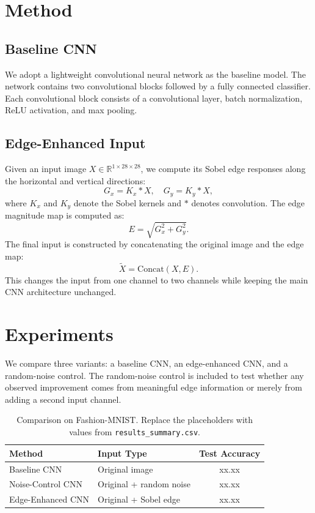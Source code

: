 \documentclass[10pt,conference]{IEEEtran}
\begin{document}
\section{Method}

\subsection{Baseline CNN}

We adopt a lightweight convolutional neural network as the baseline model. The network contains two convolutional blocks followed by a fully connected classifier. Each convolutional block consists of a convolutional layer, batch normalization, ReLU activation, and max pooling.

\subsection{Edge-Enhanced Input}

Given an input image $X \in \mathbb{R}^{1 \times 28 \times 28}$, we compute its Sobel edge responses along the horizontal and vertical directions:
\begin{equation}
G_x = K_x * X, \quad G_y = K_y * X,
\end{equation}
where $K_x$ and $K_y$ denote the Sobel kernels and $*$ denotes convolution. The edge magnitude map is computed as:
\begin{equation}
E = \sqrt{G_x^2 + G_y^2}.
\end{equation}
The final input is constructed by concatenating the original image and the edge map:
\begin{equation}
\tilde{X} = \mathrm{Concat}(X, E).
\end{equation}
This changes the input from one channel to two channels while keeping the main CNN architecture unchanged.

\section{Experiments}

We compare three variants: a baseline CNN, an edge-enhanced CNN, and a random-noise control. The random-noise control is included to test whether any observed improvement comes from meaningful edge information or merely from adding a second input channel.

\begin{table}[t]
\centering
\caption{Comparison on Fashion-MNIST. Replace the placeholders with values from \texttt{results\_summary.csv}.}
\label{tab:results}
\begin{tabular}{llc}
\toprule
Method & Input Type & Test Accuracy \\
\midrule
Baseline CNN & Original image & xx.xx \\
Noise-Control CNN & Original + random noise & xx.xx \\
Edge-Enhanced CNN & Original + Sobel edge & xx.xx \\
\bottomrule
\end{tabular}
\end{table}
\end{document}
